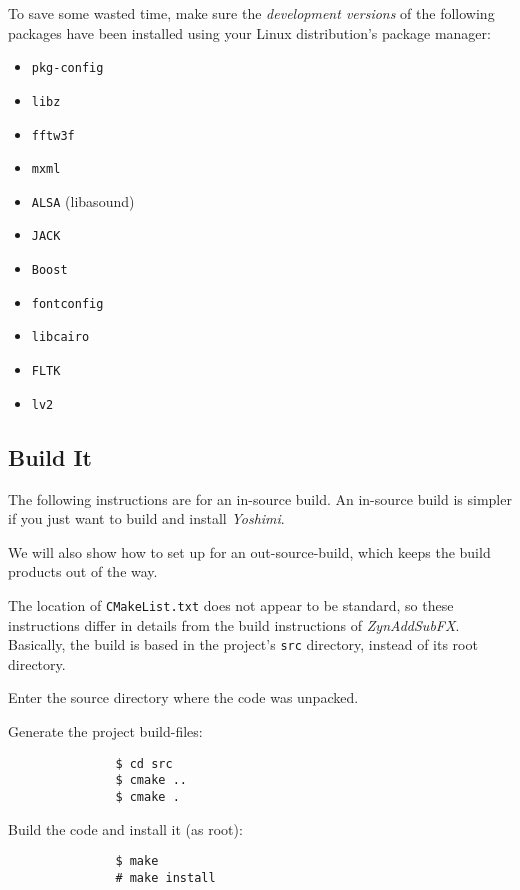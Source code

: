    To save some wasted time, make sure the \textsl{development versions}
   of the following packages have been installed using your Linux
   distribution's package manager:

   \begin{itemize}
      \item \texttt{pkg-config}
      \item \texttt{libz}
      \item \texttt{fftw3f}
      \item \texttt{mxml}
      \item \texttt{ALSA} (libasound)
      \item \texttt{JACK}
      \item \texttt{Boost}
      \item \texttt{fontconfig}
      \item \texttt{libcairo}
      \item \texttt{FLTK}
      \item \texttt{lv2}
   \end{itemize}

\subsection{Build It}
\label{subsec:yoshimi_build_it}

   The following instructions are for an in-source build.  An in-source
   build is simpler if you just want to build and install \textsl{Yoshimi}.

   We will also show how to set up for an out-source-build, which keeps
   the build products out of the way.

   The location of \texttt{CMakeList.txt} does not appear to be standard, so
   these instructions differ in details from the build instructions of
   \textsl{ZynAddSubFX}.  Basically, the build is based in the project's
   \texttt{src} directory, instead of its root directory.

   \begin{enumber}
      \item Enter the source directory where the code was unpacked.
      \item Generate the project build-files:
            \begin{verbatim}
               $ cd src
               $ cmake ..
               $ cmake .
            \end{verbatim}
      \item Build the code and install it (as root):
            \begin{verbatim}
               $ make
               # make install
            \end{verbatim}
   \end{enumber}

